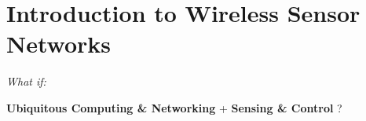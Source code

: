 
\chapter{Introduction to Wireless Sensor Networks} %
\label{Chapter1} %
\begin{center}
{\textsl{What if: }}
\begin{large}
\textbf{Ubiquitous Computing \& Networking} + \textbf{Sensing \& Control} ?
\end{large}
\end{center}


